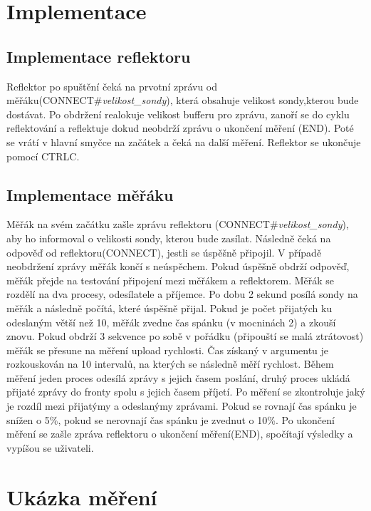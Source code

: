 \documentclass[11pt] {article}
\begin{document}
\section{Implementace}
\subsection{Implementace reflektoru}
Reflektor po spuštění čeká na prvotní zprávu od měřáku(CONNECT\#\emph{velikost\_sondy}), která obsahuje velikost sondy,kterou bude dostávat. Po obdržení realokuje velikost bufferu pro zprávu, zanoří se do cyklu reflektování a reflektuje dokud neobdrží zprávu o ukončení měření (END). Poté se vrátí v hlavní smyčce na začátek a čeká na další měření. Reflektor se ukončuje pomocí CTRL\-C.

\subsection{Implementace měřáku}
Měřák na svém začátku zašle zprávu reflektoru (CONNECT\#\emph{velikost\_sondy}), aby ho informoval o velikosti sondy, kterou bude zasílat. Následně čeká na odpověď od reflektoru(CONNECT), jestli se úspěšně připojil. V případě neobdržení zprávy měřák končí s neúspěchem.\newline
Pokud úspěšně obdrží odpověď, měřák přejde na testování připojení mezi měřákem a reflektorem. Měřák se rozdělí na dva procesy, odesílatele a příjemce. Po dobu 2 sekund posílá sondy na měřák a následně počítá, které úspěšně přijal. Pokud je počet přijatých ku odeslaným větší než 10, měřák zvedne čas spánku (v mocninách 2) a zkouší znovu. Pokud obdrží 3 sekvence po sobě v pořádku (připouští se malá ztrátovost) měřák se přesune na měření upload rychlosti.\newline
Čas získaný v argumentu je rozkouskován na 10 intervalů, na kterých se následně měří rychlost. Během měření jeden proces odesílá zprávy s jejich časem poslání, druhý proces ukládá přijaté zprávy do fronty spolu s jejich časem příjetí. Po měření se zkontroluje jaký je rozdíl mezi přijatýmy a odeslanýmy zprávami.
Pokud se rovnají čas spánku je snížen o 5\%, pokud se nerovnají čas spánku je zvednut o 10\%.
Po ukončení měření se zašle zpráva reflektoru o ukončení měření(END), spočítají výsledky a vypíšou se uživateli.


\section{Ukázka měření}
\end{document}
